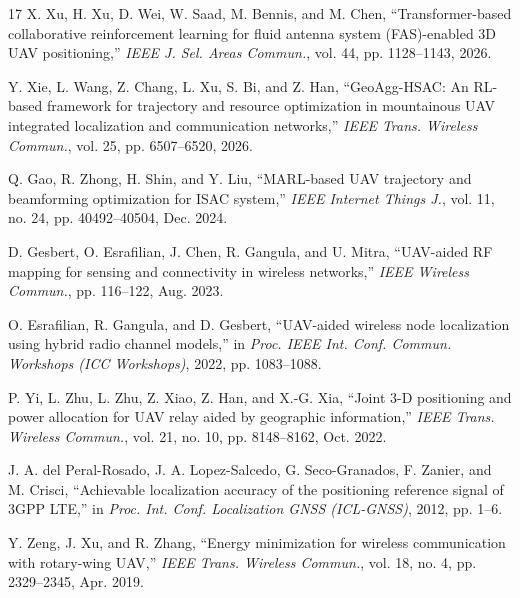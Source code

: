 \documentclass[lettersize,journal]{IEEEtran}
\begin{document}
\begin{thebibliography}{17}
X. Xu, H. Xu, D. Wei, W. Saad, M. Bennis, and M. Chen, ``Transformer-based collaborative reinforcement learning for fluid antenna system (FAS)-enabled 3D UAV positioning,'' \emph{IEEE J. Sel. Areas Commun.}, vol. 44, pp. 1128--1143, 2026.

Y. Xie, L. Wang, Z. Chang, L. Xu, S. Bi, and Z. Han, ``GeoAgg-HSAC: An RL-based framework for trajectory and resource optimization in mountainous UAV integrated localization and communication networks,'' \emph{IEEE Trans. Wireless Commun.}, vol. 25, pp. 6507--6520, 2026.

Q. Gao, R. Zhong, H. Shin, and Y. Liu, ``MARL-based UAV trajectory and beamforming optimization for ISAC system,'' \emph{IEEE Internet Things J.}, vol. 11, no. 24, pp. 40492--40504, Dec. 2024.

D. Gesbert, O. Esrafilian, J. Chen, R. Gangula, and U. Mitra, ``UAV-aided RF mapping for sensing and connectivity in wireless networks,'' \emph{IEEE Wireless Commun.}, pp. 116--122, Aug. 2023.

O. Esrafilian, R. Gangula, and D. Gesbert, ``UAV-aided wireless node localization using hybrid radio channel models,'' in \emph{Proc. IEEE Int. Conf. Commun. Workshops (ICC Workshops)}, 2022, pp. 1083--1088.

P. Yi, L. Zhu, L. Zhu, Z. Xiao, Z. Han, and X.-G. Xia, ``Joint 3-D positioning and power allocation for UAV relay aided by geographic information,'' \emph{IEEE Trans. Wireless Commun.}, vol. 21, no. 10, pp. 8148--8162, Oct. 2022.

J. A. del Peral-Rosado, J. A. Lopez-Salcedo, G. Seco-Granados, F. Zanier, and M. Crisci, ``Achievable localization accuracy of the positioning reference signal of 3GPP LTE,'' in \emph{Proc. Int. Conf. Localization GNSS (ICL-GNSS)}, 2012, pp. 1--6.

Y. Zeng, J. Xu, and R. Zhang, ``Energy minimization for wireless communication with rotary-wing UAV,'' \emph{IEEE Trans. Wireless Commun.}, vol. 18, no. 4, pp. 2329--2345, Apr. 2019.

\end{thebibliography}
\end{document}
